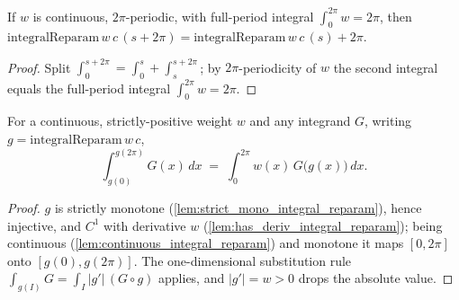 \begin{lemma}

  \label{lem:integral_reparam_add_two_pi}
  If $w$ is continuous, $2\pi$-periodic, with full-period integral
  $\int_0^{2\pi} w = 2\pi$, then
  $\mathrm{integralReparam}\,w\,c\,(s+2\pi)=\mathrm{integralReparam}\,w\,c\,(s)+2\pi$.
\end{lemma}
\begin{proof}
  \leanok
  Split $\int_0^{s+2\pi}=\int_0^{s}+\int_{s}^{s+2\pi}$; by $2\pi$-periodicity of $w$
  the second integral equals the full-period integral $\int_0^{2\pi} w = 2\pi$.
\end{proof}

\begin{lemma}

  \label{lem:integral_reparam_change_of_var}
  For a continuous, strictly-positive weight $w$ and any integrand $G$, writing
  $g=\mathrm{integralReparam}\,w\,c$,
  \[
    \int_{g(0)}^{g(2\pi)} G(x)\,dx \;=\; \int_0^{2\pi} w(x)\,G\bigl(g(x)\bigr)\,dx .
  \]
\end{lemma}
\begin{proof}
        \leanok
  $g$ is strictly monotone (\cref{lem:strict_mono_integral_reparam}), hence
  injective, and $C^1$ with derivative $w$ (\cref{lem:has_deriv_integral_reparam});
  being continuous (\cref{lem:continuous_integral_reparam}) and monotone it maps
  $[0,2\pi]$ onto $[g(0),g(2\pi)]$. The one-dimensional substitution rule
  $\int_{g(I)}G=\int_I |g'|\,(G\circ g)$ applies, and $|g'|=w>0$ drops the absolute
  value.
\end{proof}

